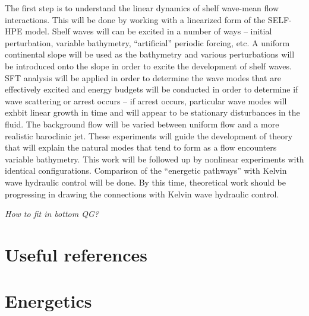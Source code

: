 \documentclass[12pt]{workjournal}
\begin{document}
The first step is to understand the linear dynamics of shelf wave-mean flow interactions. This will be done by working with a linearized form of the SELF-HPE model. Shelf waves will can be excited in a number of ways -- initial perturbation, variable bathymetry, ``artificial'' periodic forcing, etc. A uniform continental slope will be used as the bathymetry and various perturbations will be introduced onto the slope in order to excite the development of shelf waves. SFT analysis will be applied in order to determine the wave modes that are effectively excited and energy budgets will be conducted in order to determine if wave scattering  or arrest occurs -- if arrest occurs, particular wave modes will exhbit linear growth in time and will appear to be stationary disturbances in the fluid. The background flow will be varied between uniform flow and a more realistic baroclinic jet. These experiments will guide the development of theory that will explain the natural modes that tend to form as a flow encounters variable bathymetry. This work will be followed up by nonlinear experiments with identical configurations. Comparison of the ``energetic pathways'' with Kelvin wave hydraulic control will be done. By this time, theoretical work should be progressing in drawing the connections with Kelvin wave hydraulic control.


\textit{How to fit in bottom QG?}

  
\chapter{Useful references} \label{chapter:references}
 
\chapter{Energetics}
\end{document}
